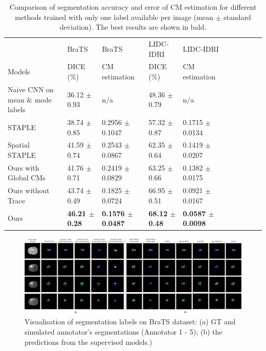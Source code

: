 \begin{table}[H]
	\center
	\scriptsize
	\begin{tabular}{@{}llllllllll}
		\hline
		 & BraTS & BraTS  & LIDC-IDRI  & LIDC-IDRI  \\
		Models & DICE (\%) & CM estimation & DICE (\%) & CM estimation \\
		  
		\hline	
		Naive CNN on mean \& mode labels& 36.12 $\pm$ 0.93  &  n/a & 48.36 $\pm$ 0.79   &  n/a  \\
		STAPLE \cite{warfield2004simultaneous}& 38.74 $\pm$ 0.85  & 0.2956 $\pm$ 0.1047  & 57.32 $\pm$ 0.87  & 0.1715 $\pm$ 0.0134     \\ 
		Spatial STAPLE \cite{asman2012formulating} & 41.59 $\pm$ 0.74  & 0.2543 $\pm$ 0.0867  & 62.35 $\pm$ 0.64  & 0.1419 $\pm$ 0.0207    \\
 		Ours with Global CMs  & 41.76 $\pm$ 0.71  & 0.2419 $\pm$ 0.0829   & 63.25 $\pm$ 0.66  & 0.1382 $\pm$ 0.0175    \\
		Ours without Trace & 43.74 $\pm$ 0.49   & 0.1825 $\pm$ 0.0724   & 66.95 $\pm$ 0.51  & 0.0921 $\pm$ 0.0167   \\
		Ours & \textbf{46.21 $\pm$ 0.28}   & \textbf{0.1576 $\pm$ 0.0487 }  & \textbf{68.12 $\pm$ 0.48}  & \textbf{0.0587 $\pm$ 0.0098   } \\
		\hline
	\end{tabular}%
		\vspace{1mm}
    \caption{\footnotesize Comparison of segmentation accuracy and error of CM estimation for different methods trained with only one label available per image (mean $\pm$ standard deviation). The best results are shown in bald.}
    \label{singlelabebrats}
\end{table}

\begin{figure}[t!]
    \centering
    \includegraphics[width=\linewidth]{chapter_8_neurips/picture16.jpg}
    \caption{Visualisation of segmentation labels on BraTS dataset: (a) GT and simulated annotator's segmentations (Annotator 1 - 5); (b) the predictions from the supervised models.) }
    \label{Brats results segmentation2}
\end{figure}


